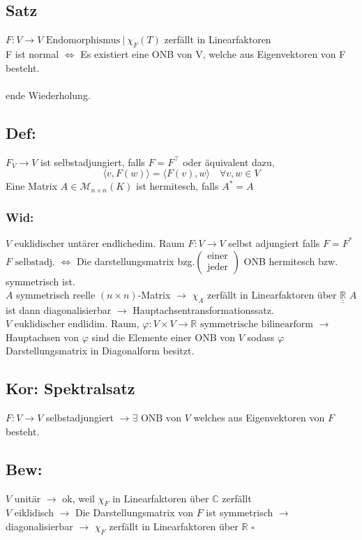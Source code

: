 \documentclass[titlepage,12pt,a4paper,ngerman]{report}
\newenvironment{bew}[1]{\subsection{Bew: #1}}{\hfill$\square$}
\newcommand{\Bew}[2]{\begin{bew}{#1}#2\end{bew}}
\newcommand{\tx}[1]{\textrm{#1}}
\newcommand{\ska}[2]{\langle #1 , #2 \rangle}
\newcommand{\enph}{F: V \to V \textrm{ Endomorphismus}}
\begin{document}
\subsection{Satz} $ \enph\  | \  \chi_F(T) $ zerfällt in Linearfaktoren\\
F ist normal $ \Leftrightarrow $ Es existiert eine ONB von V, welche aus Eigenvektoren von F besteht.\\\\
ende Wiederholung.

\subsection{Def:}$ F_V\to V $ ist selbstadjungiert, falls $ F = F^\top $ oder äquivalent dazu,
$$\ska{v}{F(w)} = \ska{F(v)}{w} \quad \forall v,w \in V$$
Eine Matrix $ A \in \mathcal{M}_{n\times n} (K) $ ist hermitesch, falls $ A^* = A $
\subsubsection{Wid:}
$V$ euklidischer untärer endlichedim. Raum $F: V \to V$ selbst adjungiert falls $F = F^*$\\ 
$F \tx{ selbstadj. } \Leftrightarrow$ Die darstellungsmatrix bzg.$\begin{pmatrix}
\tx{einer} \\ \tx{jeder}
\end{pmatrix}$ ONB hermitesch bzw. symmetrisch ist.\\
$A$ symmetrisch reelle $(n \times n)$-Matrix $\rightarrow$ $\chi_A$ zerfällt in Linearfaktoren über $\underline{\underline{\mathbb R}}$
$A$ ist dann diagonalisierbar $\rightarrow$ Hauptachsentransformationssatz.\\ 
$V \tx{ euklidischer endlidim. Raum}$, $\varphi: V \times V \to \mathbb R \tx{ symmetrische bilinearform}$
$\rightarrow$ Hauptachsen von $\varphi$ sind die Elemente einer ONB von $V$ sodass $\varphi$ Darstellungsmatrix in Diagonalform besitzt.
\subsection{Kor: Spektralsatz}
$F:V\to V$ selbstadjungiert $\rightarrow \exists \tx{ ONB von } V$ welches aus Eigenvektoren von $F$ besteht.
\Bew{}{$V$ unitär $\rightarrow$ ok, weil $\chi_F$ in Linearfaktoren über $\mathbb C$ zerfällt\\
	$V$ eiklidisch $\rightarrow$ Die Darstellungsmatrix von $F$ ist symmetrisch $\rightarrow$ diagonalisierbar $\rightarrow$ $\chi_F$ zerfällt in Linearfaktoren über $\mathbb R$ 
}
\end{document}
